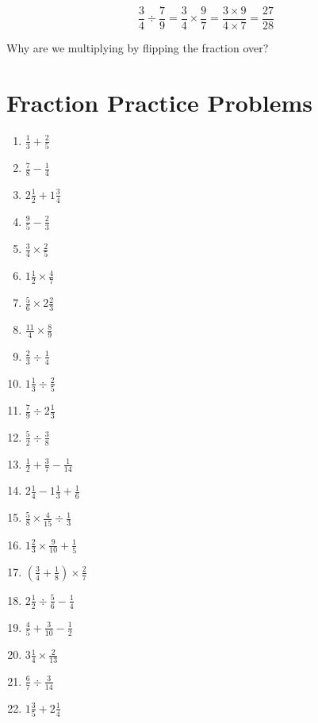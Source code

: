 \documentclass{article}
\theoremstyle{mytheoremstyle}
\theoremstyle{mytheoremstyle}
\theoremstyle{myproblemstyle}
\theoremstyle{myproblemstyle}
\begin{document}
    \[\frac{3}{4} \div \frac{7}{9} = \frac{3}{4} \times \frac{9}{7} = \frac{3 \times 9}{4 \times 7} = \frac{27}{28}\]

    \begin{problem}
        Why are we multiplying by flipping the fraction over?
    \end{problem}

    \section*{Fraction Practice Problems}

    \begin{enumerate}
        \item $\frac{1}{3} + \frac{2}{5}$ \hfill \item $\frac{7}{8} - \frac{1}{4}$ \hfill
        \item $2\frac{1}{2} + 1\frac{3}{4}$ \hfill \item $\frac{9}{5} - \frac{2}{3}$ \hfill
        \item $\frac{3}{4} \times \frac{2}{5}$ \hfill \item $1\frac{1}{2} \times \frac{4}{7}$ \hfill
        \item $\frac{5}{6} \times 2\frac{2}{3}$ \hfill \item $\frac{11}{4} \times \frac{8}{9}$ \hfill
        \item $\frac{2}{3} \div \frac{1}{4}$ \hfill \item $1\frac{1}{3} \div \frac{2}{5}$ \hfill
        \item $\frac{7}{9} \div 2\frac{1}{3}$ \hfill \item $\frac{5}{2} \div \frac{3}{8}$ \hfill
        \item $\frac{1}{2} + \frac{3}{7} - \frac{1}{14}$ \hfill \item $2\frac{1}{4} - 1\frac{1}{3} + \frac{1}{6}$ \hfill
        \item $\frac{5}{8} \times \frac{4}{15} \div \frac{1}{3}$ \hfill \item $1\frac{2}{3} \times \frac{9}{10} + \frac{1}{5}$ \hfill
        \item $\left(\frac{3}{4} + \frac{1}{8}\right) \times \frac{2}{7}$ \hfill \item $2\frac{1}{2} \div \frac{5}{6} - \frac{1}{4}$ \hfill
        \item $\frac{4}{5} + \frac{3}{10} - \frac{1}{2}$ \hfill \item $3\frac{1}{4} \times \frac{2}{13}$ \hfill
        \item $\frac{6}{7} \div \frac{3}{14}$ \hfill \item $1\frac{3}{5} + 2\frac{1}{4}$ \hfill

\end{enumerate}
\end{document}
